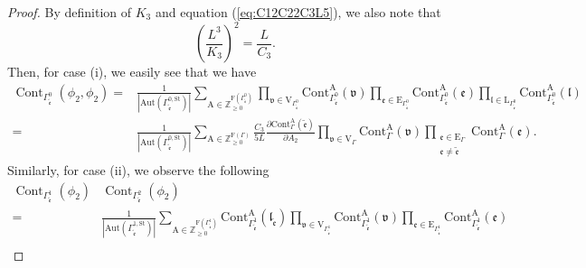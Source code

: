 \documentclass[10pt,a4paper]{amsart}
\begin{document}
\begin{proof}
By definition of $K_3$ and equation (\ref{eq:C12C22C3L5}), we also note that 
\begin{equation*}
\left(\frac{L^{3}}{K_{3}}\right)^2=\frac{L}{C_{3}}.
\end{equation*}
Then, for case (i), we easily see that we have
\begin{equation}\label{eq:2_insertions_graph_cont}
\begin{aligned}
\operatorname{Cont}_{\Gamma_{\tilde{\mathfrak{e}}}^0}\left(\phi_2,\phi_2\right)
=&\frac{1}{|\mathrm{Aut}(\Gamma_{\tilde{\mathfrak{e}}}^{0,\mathrm{St}})|} \sum_{\mathrm{A} \in \mathbb{Z}_{\geq 0}^{\mathrm{F}({\Gamma_{\tilde{\mathfrak{e}}}^0})}} \prod_{\mathfrak{v} \in \mathrm{V}_{\Gamma_{\tilde{\mathfrak{e}}}^0}} \mathrm{Cont}_{\Gamma_{\tilde{\mathfrak{e}}}^0}^{\mathrm{A}}(\mathfrak{v}) \prod_{\mathfrak{e} \in \mathrm{E}_{\Gamma_{\tilde{\mathfrak{e}}}^0}} \mathrm{Cont}_{\Gamma_{\tilde{\mathfrak{e}}}^0}^{\mathrm{A}}(\mathfrak{e})\prod_{\mathfrak{l} \in \mathrm{L}_{\Gamma_{\tilde{\mathfrak{e}}}^0}} \mathrm{Cont}_{\Gamma_{\tilde{\mathfrak{e}}}^0}^{\mathrm{A}}(\mathfrak{l})\\
=&\frac{1}{|\mathrm{Aut}(\Gamma_{\tilde{\mathfrak{e}}}^{0,\mathrm{St}})|} \sum_{\mathrm{A} \in \mathbb{Z}_{\geq 0}^{\mathrm{F}(\Gamma)}}\frac{C_3}{5L}\frac{\partial \mathrm{Cont}_{\Gamma}^{\mathrm{A}}(\tilde{\mathfrak{e}}) }{\partial A_2} \prod_{\mathfrak{v} \in \mathrm{V}_{\Gamma}} \mathrm{Cont}_{\Gamma}^{\mathrm{A}}(\mathfrak{v}) \prod_{\substack{
\mathfrak{e} \in \mathrm{E}_{\Gamma} \\ \mathfrak{e}\neq \tilde{\mathfrak{e}}}} \mathrm{Cont}_{\Gamma}^{\mathrm{A}}(\mathfrak{e}).
\end{aligned}
\end{equation}
Similarly, for case (ii), we observe the following
\begin{equation}\label{eq:prod_of_1_insertions_graph_conts}
\begin{aligned}
\operatorname{Cont}_{\Gamma_{\tilde{\mathfrak{e}}}^1}\left(\phi_{2}\right)&\operatorname{Cont}_{\Gamma_{\tilde{\mathfrak{e}}}^2}\left(\phi_{2}\right)\\
=&\frac{1}{|\mathrm{Aut}(\Gamma_{\tilde{\mathfrak{e}}}^{1,\mathrm{St}})|} \sum_{\mathrm{A} \in \mathbb{Z}_{\geq 0}^{\mathrm{F}({\Gamma_{\tilde{\mathfrak{e}}}^1})}} \mathrm{Cont}_{\Gamma_{\tilde{\mathfrak{e}}}^1}^{\mathrm{A}}(\mathfrak{l}_{\tilde{\mathfrak{e}}})\prod_{\mathfrak{v} \in \mathrm{V}_{\Gamma_{\tilde{\mathfrak{e}}}^1}} \mathrm{Cont}_{\Gamma_{\tilde{\mathfrak{e}}}^1}^{\mathrm{A}}(\mathfrak{v}) \prod_{\mathfrak{e} \in \mathrm{E}_{\Gamma_{\tilde{\mathfrak{e}}}^1}} \mathrm{Cont}_{\Gamma_{\tilde{\mathfrak{e}}}^1}^{\mathrm{A}}(\mathfrak{e})\\

\end{aligned}
\end{equation}
\end{proof}
\end{document}
